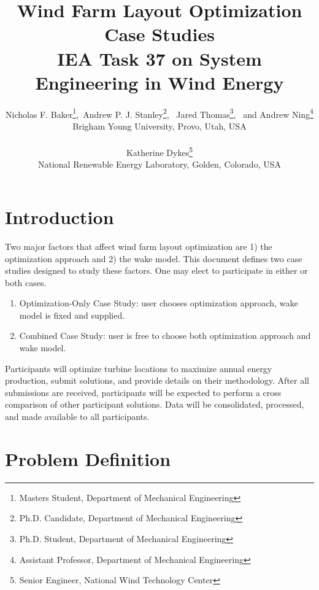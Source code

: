 \documentclass{article}
\begin{document}
\title{Wind Farm Layout Optimization Case Studies
\\
\small{IEA Task 37 on System Engineering in Wind Energy}
}
\author{\small Nicholas F. Baker\thanks{Masters Student, Department of Mechanical Engineering},\  Andrew P. J. Stanley\thanks{Ph.D. Candidate, Department of Mechanical Engineering}, \ Jared Thomas\thanks{Ph.D. Student, Department of Mechanical Engineering}, \ and Andrew Ning\thanks{Assistant Professor, Department of Mechanical Engineering} \\
    {\small Brigham Young University, Provo, Utah, USA}\\
\vspace{-1em}\\
\small Katherine Dykes\thanks{Senior Engineer, National Wind Technology Center}\\
    \small National Renewable Energy Laboratory, Golden, Colorado, USA}
\maketitle

\section{Introduction}

    Two major factors that affect wind farm layout optimization are 1) the optimization approach and 2) the wake model. This document defines two case studies designed to study these factors. One may elect to participate in either or both cases.
    \begin{enumerate}
        \item Optimization-Only Case Study: user chooses optimization approach, wake model is fixed and supplied.
        \item Combined Case Study: user is free to choose both optimization approach and wake model.
    \end{enumerate}

    Participants will optimize turbine locations to maximize annual energy production, submit solutions, and provide details on their methodology.  After all submissions are received, participants will be expected to perform a cross comparison of other participant solutions.  Data will be consolidated, processed, and made available to all participants.

\section{Problem Definition}
\end{document}
